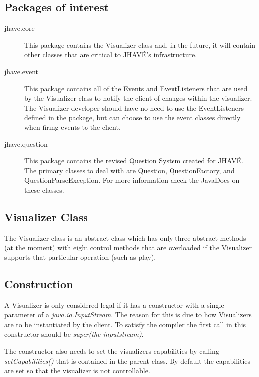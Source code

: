 \documentclass[11pt,letterpaper]{book}
\begin{document}
\subsection{Packages of interest}

\begin{description}
\item[jhave.core] This package contains the Visualizer class and, in
  the future, it will contain other classes that are critical to
  JHAV\'{E}’s infrastructure.

\item[jhave.event] This package contains all of the Events and
  EventListeners that are used by the Visualizer class to notify the
  client of changes within the visualizer. The Visualizer developer
  should have no need to use the EventListeners defined in the
  package, but can choose to use the event classes directly when
  firing events to the client.

\item[jhave.question] This package contains the revised Question
  System created for JHAV\'{E}. The primary classes to deal with are
  Question, QuestionFactory, and QuestionParseException. For more
  information check the JavaDocs on these classes.
\end{description}

\subsection{Visualizer Class}
The Visualizer class is an abstract class which has only three
abstract methods (at the moment) with eight control methods that are
overloaded if the Visualizer supports that particular operation (such
as play).

\subsection{Construction}
A Visualizer is only considered legal if it has a constructor with a
single parameter of a \textit{java.io.InputStream}. The reason for this is due
to how Visualizers are to be instantiated by the client. To satisfy
the compiler the first call in this constructor should be \newline \textit{super(the inputstream)}.

The constructor also needs to set the visualizers capabilities by
calling \textit{setCapabilities()} that is contained in the parent class. By
default the capabilities are set so that the visualizer is not
controllable.
\end{document}
